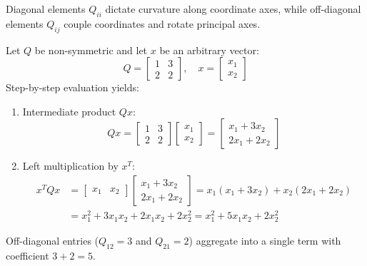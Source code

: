 Diagonal elements $Q_{ii}$ dictate curvature along coordinate axes, while off-diagonal elements $Q_{ij}$ couple coordinates and rotate principal axes.

\begin{example}
Let $Q$ be non-symmetric and let $x$ be an arbitrary vector:
\begin{equation}
Q = \begin{bmatrix} 1 & 3 \\ 2 & 2 \end{bmatrix}, \quad x = \begin{bmatrix} x_1 \\ x_2 \end{bmatrix}
\end{equation}
Step-by-step evaluation yields:
\begin{enumerate}
    \item Intermediate product $Qx$:
    \begin{equation}
    Qx = \begin{bmatrix} 1 & 3 \\ 2 & 2 \end{bmatrix} \begin{bmatrix} x_1 \\ x_2 \end{bmatrix} = \begin{bmatrix} x_1 + 3x_2 \\ 2x_1 + 2x_2 \end{bmatrix}
    \end{equation}
    \item Left multiplication by $x^T$:
    \begin{align}
    x^T Q x &= \begin{bmatrix} x_1 & x_2 \end{bmatrix} \begin{bmatrix} x_1 + 3x_2 \\ 2x_1 + 2x_2 \end{bmatrix} = x_1(x_1 + 3x_2) + x_2(2x_1 + 2x_2) \nonumber \\
    &= x_1^2 + 3x_1 x_2 + 2x_1 x_2 + 2x_2^2 = x_1^2 + 5x_1 x_2 + 2x_2^2
    \end{align}
\end{enumerate}
Off-diagonal entries ($Q_{12} = 3$ and $Q_{21} = 2$) aggregate into a single term with coefficient $3 + 2 = 5$.
\end{example}

